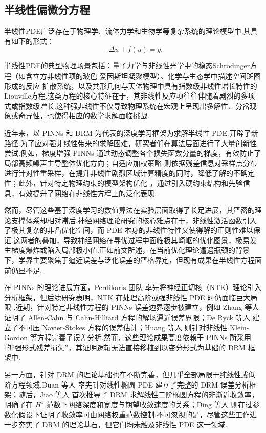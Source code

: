 \subsection{半线性偏微分方程}
半线性PDE广泛存在于物理学、流体力学和生物学等复杂系统的理论模型中.其具有如下的形式：
$$
-\Delta u+f\left(u\right) =g.
$$

半线性PDE的典型物理场景包括：量子力学与非线性光学中的稳态Schr\"{o}dinger方程（如含立方非线性项的玻色-爱因斯坦凝聚模型）、化学与生态学中描述空间斑图形成的反应-扩散系统，以及共形几何与天体物理中具有指数级非线性增长特性的Liouville方程.这类方程的核心特征在于，其非线性反应项往往伴随着剧烈的多项式或指数级增长.这种强非线性不仅导致物理系统在宏观上呈现出多解性、分岔现象或奇异性，也使得相应的数学求解面临挑战.

近年来，以 PINNs 和 DRM 为代表的深度学习框架为求解半线性 PDE 开辟了新路径.为了应对强非线性带来的求解困难，研究者们在算法层面进行了大量创新性尝试.例如，梯度增强 PINNs \cite{lawal2022physics} 通过动态调整各个损失函数分量的梯度，有效防止了局部高频噪声主导整体优化方向；自适应加权策略 \cite{wight2020solving,jiao2024gaussian} 则依据残差信息对采样点分布进行针对性重采样，在提升非线性剧烈区域计算精度的同时，降低了解的不确定性；此外，针对特定物理约束的模型架构优化 \cite{qiu2025data}，通过引入硬约束结构和先验信息，有效提升了网络在非线性方程上的泛化表现.

然而，尽管这些基于深度学习的数值算法在实验层面取得了长足进展，其严密的理论支撑体系却相对滞后.神经网络理论研究的核心难点在于，非线性激活函数引入了极其复杂的非凸优化空间，而 PDE 本身的非线性特性又使得解的正则性难以保证.这两者的叠加，导致神经网络在寻优过程中面临极其崎岖的优化图景，极易发生梯度爆炸或陷入局部极小值.正如前文所述，在当前优化理论遭遇瓶颈的背景下，学界主要聚焦于逼近误差与泛化误差的严格界定，但现有成果在半线性方程面前仍显不足.

在 PINNs 的理论进展方面，Perdikaris 团队 \cite{wang2022and} 率先将神经正切核（NTK）理论引入分析框架，但后续研究表明，NTK 在处理高阶或强非线性 PDE 时仍面临巨大局限 \cite{bonfanti2024challenges}.近期，针对特定非线性方程的 PINNs 误差边界逐步被建立，例如 Zhang 等人 \cite{zhang2024priori} 证明了 Allen-Cahn 与 Cahn-Hilliard 方程的解场逼近误差界限；De Ryck 等人 \cite{de2024error} 建立了不可压 Navier-Stokes 方程的误差估计；Huang 等人 \cite{qian2023physics} 则针对非线性 Klein-Gordon 等方程完善了误差分析.然而，这些理论成果高度依赖于 PINNs 所采用的“强形式残差损失”，其证明逻辑无法直接移植到以变分形式为基础的 DRM 框架中.

另一方面，针对 DRM 的理论基础也在不断完善，但几乎全部局限于纯线性或低阶方程领域.Duan 等人 \cite{duan2022convergence} 率先针对线性椭圆 PDE 建立了完整的 DRM 误差分析框架；随后，Jiao 等人 \cite{jiao2024error,jiao2025error} 首次推导了 DRM 求解线性二阶椭圆方程的非渐近收敛率，明确了在 $H^1$ 范数下网络深度和宽度与期望收敛速度的关系；Ding 等人 \cite{ding2025convergence} 则在过参数化假设下证明了收敛率可由网络权重范数控制.不可忽视的是，尽管这些工作进一步夯实了 DRM 的理论基石，但它们均未触及非线性 PDE 这一领域.

